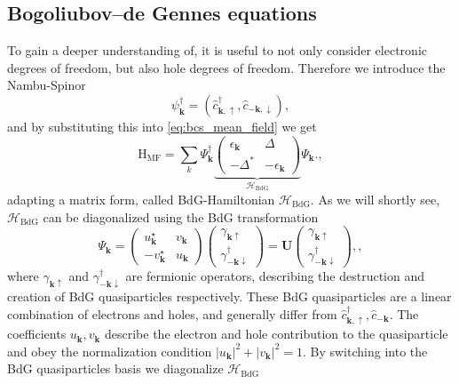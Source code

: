 \subsection{Bogoliubov--de Gennes equations}
\label{sec:bdg}
To gain a deeper understanding of, it is useful to not only consider electronic degrees of freedom, but also hole degrees of freedom. Therefore we introduce the Nambu-Spinor 
\begin{equation}
    \psi_\mathbf{k}^\dagger = \left(\hat{c}_\mathbf{k, \uparrow}^\dagger, \hat{c}_{-\mathbf{k}, \downarrow}\right)
    \label{eq:nambu_spinor},
\end{equation} 
and by substituting this into \eqref{eq:bcs_mean_field} we get 
\begin{equation}
	\mathrm{H}_\text{MF} = \sum_k \Psi^\dagger_\mathbf{k} \underbrace{\scriptstyle{\begin{pmatrix} \epsilon_\mathbf{k}&\Delta \\ -\Delta^*  &-\epsilon_\mathbf{k}\end{pmatrix}}}_{\mathcal{H}_\text{BdG}} \Psi_\mathbf{k}.
	\label{eq:bdg_ham},
\end{equation}
adapting a matrix form, called BdG-Hamiltonian $\mathcal{H}_\text{BdG}$. As we will shortly see, $\mathcal{H}_\text{BdG}$ can be diagonalized using the BdG transformation
\begin{equation}
	\Psi_\mathbf{k}	 = \begin{pmatrix} u_\mathbf{k}^\star & v_\mathbf{k} \\ -v_\mathbf{k}^\star & u_\mathbf{k} \end{pmatrix} \begin{pmatrix} \gamma_{\mathbf{k}\uparrow} \\ \gamma_{-\mathbf{k}\downarrow}^\dagger \end{pmatrix} = \mathbf{U} \begin{pmatrix} \gamma_{\mathbf{k}\uparrow} \\ \gamma_{-\mathbf{k}\downarrow}^\dagger \end{pmatrix},
	\label{eq:bdg_transformation},
\end{equation}
where $\gamma_{\mathbf{k}\uparrow}$ and $\gamma_{-\mathbf{k}\downarrow}^\dagger$ are fermionic operators, describing the destruction and creation of BdG quasiparticles respectively. These BdG quasiparticles are a linear combination of electrons and holes, and generally differ from $\hat{c}_\mathbf{k, \uparrow}^\dagger, \hat{c}_{-\mathbf{k}}$. The coefficients $u_\mathbf{k}, v_\mathbf{k}$ describe the electron and hole contribution to the quasiparticle and obey the normalization condition $|u_\mathbf{k}|^2 + |v_\mathbf{k}|^2 = 1$. By switching into the BdG quasiparticles basis we diagonalize $\mathcal{H}_\text{BdG}$ 
